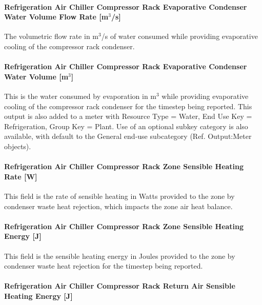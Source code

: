 \paragraph{Refrigeration Air Chiller Compressor Rack Evaporative Condenser Water Volume Flow Rate {[}m\(^{3}\)/s{]}}\label{refrigeration-air-chiller-compressor-rack-evaporative-condenser-water-volume-flow-rate-m3s}

The volumetric flow rate in m\(^{3}\)/s of water consumed while providing evaporative cooling of the compressor rack condenser.

\paragraph{Refrigeration Air Chiller Compressor Rack Evaporative Condenser Water Volume {[}m\(^{3}\){]}}\label{refrigeration-air-chiller-compressor-rack-evaporative-condenser-water-volume-m3}

This is the water consumed by evaporation in m\(^{3}\) while providing evaporative cooling of the compressor rack condenser for the timestep being reported. This output is also added to a meter with Resource Type = Water, End Use Key = Refrigeration, Group Key = Plant. Use of an optional subkey category is also available, with default to the General end-use subcategory (Ref. Output:Meter objects).

\paragraph{Refrigeration Air Chiller Compressor Rack Zone Sensible Heating Rate {[}W{]}}\label{refrigeration-air-chiller-compressor-rack-zone-sensible-heating-rate-w}

This field is the rate of sensible heating in Watts provided to the zone by condenser waste heat rejection, which impacts the zone air heat balance.

\paragraph{Refrigeration Air Chiller Compressor Rack Zone Sensible Heating Energy {[}J{]}}\label{refrigeration-air-chiller-compressor-rack-zone-sensible-heating-energy-j}

This field is the sensible heating energy in Joules provided to the zone by condenser waste heat rejection for the timestep being reported.

\paragraph{Refrigeration Air Chiller Compressor Rack Return Air Sensible Heating Energy {[}J{]}}\label{refrigeration-air-chiller-compressor-rack-return-air-sensible-heating-energy-j}


